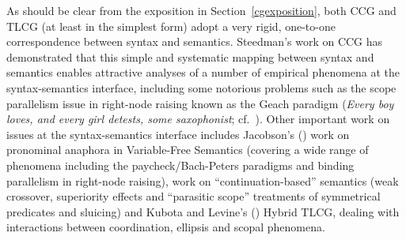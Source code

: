 \documentclass[output=paper,biblatex,babelshorthands,newtxmath,draftmode,colorlinks,citecolor=brown]{langscibook}
\begin{document}
As should be clear from the exposition in Section~\ref{cgexposition},
both CCG and TLCG (at 
least in the simplest form) adopt a very rigid, one-to-one
correspondence between syntax and semantics. Steedman's work on CCG
has demonstrated that 
this simple and systematic mapping between syntax and semantics
enables attractive analyses of
a number of empirical phenomena at the syntax-semantics interface,
including some notorious problems such as the scope parallelism issue
in right-node raising known as
the Geach paradigm (\textit{Every boy loves, and
every girl detests, some saxophonist}; cf.~\citealt[8]{Geach70a}). Other important work on issues
at the syntax-semantics interface includes Jacobson's
(\citeyear{Jacobson1999a,Jacobson2000a}) work on pronominal anaphora
in Variable-Free Semantics (covering a wide range of phenomena
including the paycheck/Bach-Peters paradigms and binding parallelism
in right-node raising),  work on ``continuation-based''
semantics (weak crossover, superiority effects and ``parasitic scope''
treatments of symmetrical predicates and sluicing) and Kubota and
Levine's
(\citeyear{kubota-levine-coord,kubota-levine-pseudo,KubotaLevineBook})
Hybrid TLCG, dealing with interactions between coordination, ellipsis and scopal
phenomena.



\end{document}
